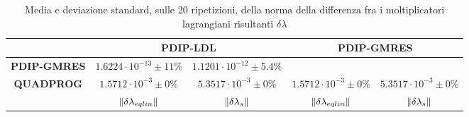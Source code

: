 \begin{table}[!h]
\begin{tabular}{c|c|c|c|c|}
                   & \multicolumn{2}{c|}{\textbf{PDIP-LDL}}                                        & \multicolumn{2}{c|}{\textbf{PDIP-GMRES}}                                      \\ \hline
\textbf{PDIP-GMRES} & $1.6224\cdot10^{-13}\pm11\%$          & $1.1201\cdot10^{-12}\pm5.4\%$         & \multicolumn{2}{c|}{ }                                                        \\ 
\textbf{QUADPROG}   & $1.5712\cdot10^{-3}\pm0\%$            & $5.3517\cdot10^{-3}\pm0\%$            & $1.5712\cdot10^{-3}\pm0\%$            & $5.3517\cdot10^{{-3}}\pm0\%$          \\
                    & $\left\lVert \delta\lambda_{eqlin} \right\rVert$ & $\left\lVert \delta\lambda_{s} \right\rVert$ & $\left\lVert \delta\lambda_{eqlin} \right\rVert$ & $\left\lVert \delta\lambda_{s} \right\rVert$
\end{tabular}
\caption{Media e deviazione standard, sulle 20 ripetizioni, della norma della differenza fra i moltiplicatori lagrangiani risultanti $\delta\lambda$\label{tab:norml}}
\end{table}